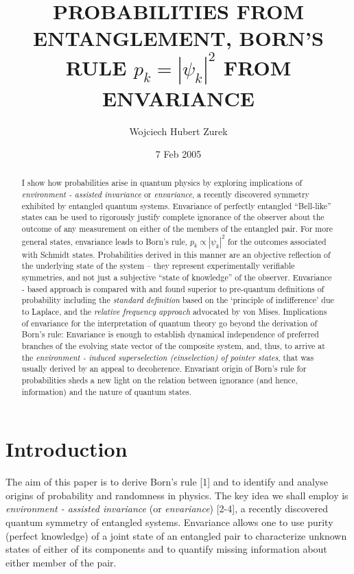 \documentclass[aps,pra,epsfig,11pt,floatfix]{revtex4}
\begin{document}
\title{ PROBABILITIES FROM ENTANGLEMENT, BORN'S RULE $p_k=|\psi_k|^2$ FROM ENVARIANCE}
\author{Wojciech Hubert Zurek}

    \address{Theory Division, MS B210, LANL
    Los Alamos, NM, 87545, U.S.A.}

\date{7 Feb 2005}

\begin{abstract}
I show how probabilities arise in quantum physics by exploring implications
of {\it environment - assisted invariance} or {\it envariance},
a recently discovered symmetry exhibited by entangled quantum systems.
Envariance of perfectly entangled ``Bell-like'' states can be used to rigorously justify
complete ignorance of the observer about the outcome of any measurement
on either of the members of the entangled pair. For more general states, envariance 
leads to Born's rule, $p_k \propto |\psi_k|^2$ for the outcomes associated with
Schmidt states. Probabilities derived in this manner are an
objective reflection of the underlying state of the system -- they represent
experimentally verifiable symmetries, and not just a subjective ``state of
knowledge'' of the observer. Envariance - based approach is compared with
and found superior to pre-quantum definitions of probability including
the {\it standard definition} based on the `principle of indifference' due
to Laplace, and the {\it relative frequency approach} advocated by von Mises.
Implications of envariance for the interpretation of quantum theory go beyond
the derivation of Born's rule: Envariance is enough to establish dynamical
independence of preferred branches of the evolving state vector of
the composite system, and, thus, to arrive at the {\it environment - induced
superselection (einselection) of pointer states}, that was usually derived
by an appeal to decoherence. Envariant origin of Born's rule for probabilities
sheds a new light on the relation between ignorance (and hence, information)
and the nature of quantum states.
\end{abstract}
\maketitle
\section{Introduction}

The aim of this paper is to derive Born's rule [1] and to identify and analyse
origins of probability and randomness in physics. The key idea we shall employ
is {\it environment - assisted invariance} (or {\it envariance}) [2-4],
a recently discovered quantum symmetry of entangled systems.  Envariance
allows one to use purity (perfect knowledge) of a joint state of an entangled pair 
to characterize unknown states of either of its components and to quantify
missing information about either member of the pair.
\end{document}
